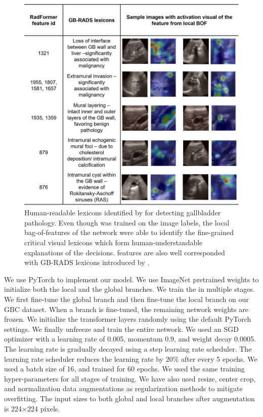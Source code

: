\begin{figure}[t]
    \centering
    \includegraphics[width=0.62\linewidth]{figs/radformer/features-rev.png}
    \caption[Human-readable lexicons identified by \radformer]{Human-readable lexicons identified by \radformer for detecting gallbladder pathology. Even though \radformer was trained on the image labels, the local bag-of-features of the network were able to identify the fine-grained critical visual lexicons which form human-understandable explanations of the decisions. \radformer features are also well corresponded with GB-RADS lexicons introduced by \cite{gb-rads-paper}. }
    \label{fig:rads_features}
\end{figure}

%
\par We use PyTorch \cite{pytorch} to implement our model. We use ImageNet \cite{imagenet} pretrained weights to initialize both the local and the global branches. We train the \radformer in multiple stages. We first fine-tune the global branch and then fine-tune the local branch on our GBC dataset. When a branch is fine-tuned, the remaining network weights are frozen. We initialize the transformer layers randomly using the default PyTorch settings. We finally unfreeze and train the entire network. We used an SGD optimizer with a learning rate of 0.005, momentum 0.9, and weight decay 0.0005. The learning rate is gradually decayed using a step learning rate scheduler. The learning rate scheduler reduces the learning rate by 20\% after every 5 epochs. We used a batch size of 16, and trained for 60 epochs. We used the same training hyper-parameters for all stages of training. We have also used resize, center crop, and normalization data augmentations as regularization methods to mitigate overfitting. The input sizes to both global and local branches after augmentation is 224$\times$224 pixels.

